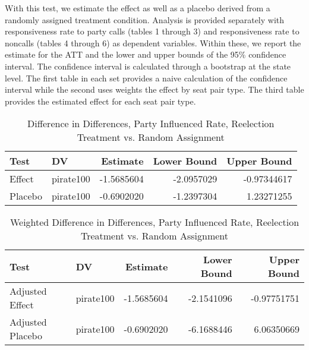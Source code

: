 \documentclass[12pt]{article}
\begin{document}
With this test, we estimate the effect as well as a placebo derived from a randomly assigned treatment condition. Analysis is provided separately with responsiveness rate to party calls (tables 1 through 3) and responsiveness rate to noncalls (tables 4 through 6) as dependent variables. Within these, we report the estimate for the ATT and the lower and upper bounds of the 95\% confidence interval. The confidence interval is calculated through a bootstrap at the state level. The first table in each set provides a naive calculation of the confidence interval while the second uses weights the effect by seat pair type. The third table provides the estimated effect for each seat pair type.

\pagebreak

\begin{table}[H]
	\centering
	\caption{Difference in Differences, Party Influenced Rate, Reelection Treatment vs. Random Assignment}
	\begin{tabular}{llrrr}
		\hline
		Test & DV & Estimate & Lower Bound & Upper Bound \\ 
		\hline
		Effect & pirate100 & -1.5685604 & -2.0957029 & -0.97344617 \\ 
		Placebo & pirate100 & -0.6902020 & -1.2397304 & 1.23271255 \\ 
		\hline
	\end{tabular}
\end{table}

\begin{table}[H]
	\centering
	\caption{Weighted Difference in Differences, Party Influenced Rate, Reelection Treatment vs. Random Assignment}
	\begin{tabular}{llrrr}
		\hline
		Test & DV & Estimate & Lower Bound & Upper Bound \\  
		\hline
		Adjusted Effect & pirate100 & -1.5685604 & -2.1541096 & -0.97751751 \\ 
		Adjusted Placebo & pirate100 & -0.6902020 & -6.1688446 & 6.06350669 \\ 
		\hline
	\end{tabular}
\end{table}
\end{document}
